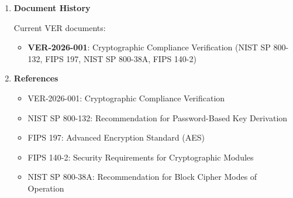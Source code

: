 \documentclass[11pt,letterpaper]{article}
\newcommand{\dmsection}[1]{\item \textbf{#1}\par}
\begin{document}
\begin{enumerate}
\dmsection{Document History}

Current VER documents:
\begin{itemize}
    \item \textbf{VER-2026-001}: Cryptographic Compliance Verification (NIST SP 800-132, FIPS 197, NIST SP 800-38A, FIPS 140-2)
\end{itemize}

\dmsection{References}

\begin{itemize}
    \item VER-2026-001: Cryptographic Compliance Verification
    \item NIST SP 800-132: Recommendation for Password-Based Key Derivation
    \item FIPS 197: Advanced Encryption Standard (AES)
    \item FIPS 140-2: Security Requirements for Cryptographic Modules
    \item NIST SP 800-38A: Recommendation for Block Cipher Modes of Operation
\end{itemize}

\end{enumerate}
\end{document}
